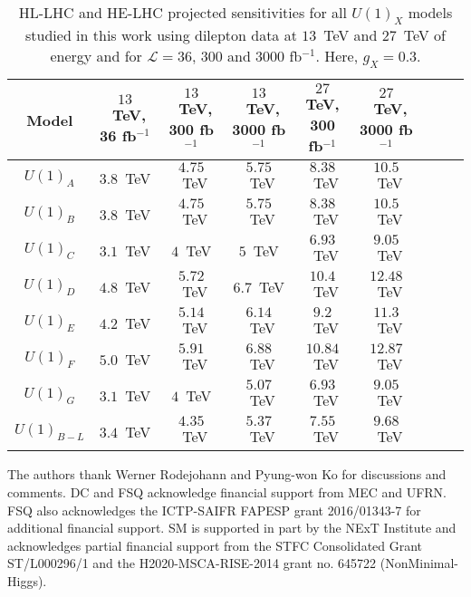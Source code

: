 \begin{table*}[!t]
\centering
\small\begin{tabular}{ccccccccc}
\hline 
Model & $13$~TeV, 36 fb$^{-1}$ & $13$~TeV, 300 fb$^{-1}$ &  $13$~TeV, 3000 fb$^{-1}$ & $27$ TeV, 300 fb$^{-1}$  & $27$~TeV, 3000 fb$^{-1}$\\ \hline 
$U(1)_A$ & $3.8$~TeV & $4.75$~TeV & $5.75$~TeV & $8.38$~TeV & $10.5$~TeV \\
$U(1)_B$ & $3.8$~TeV & $4.75$~TeV & $5.75$~TeV & $8.38$~TeV & $10.5$~TeV \\
$U(1)_C$ & $3.1$~TeV & $4$~TeV & $5$~TeV & $6.93$~TeV & $9.05$~TeV \\
$U(1)_D$ & $4.8$~TeV & $5.72$~TeV & $6.7$~TeV & $10.4$~TeV & $12.48$~TeV \\
$U(1)_E$ & $4.2$~TeV & $5.14$~TeV & $6.14$~TeV & $9.2$~TeV & $11.3$~TeV \\
$U(1)_F$ & $5.0$~TeV & $5.91$~TeV & $6.88$~TeV & $10.84$~TeV & $12.87$~TeV \\
$U(1)_G$ & $3.1$~TeV & $4$~TeV & $5.07$~TeV & $6.93$~TeV & $9.05$~TeV \\
$U(1)_{B-L}$ & $3.4$~TeV & $4.35$~TeV & $5.37$~TeV & $7.55$~TeV  & $9.68$~TeV \\
\hline
\end{tabular}\normalsize
\caption{HL-LHC and HE-LHC projected sensitivities for all $U(1)_X$ models studied in this work
using dilepton data at $13$~TeV and $27$~TeV of \com energy and for $\mathcal{L}=36$, 300 and 3000 fb$^{-1}$. Here, $g_X =0.3$.}
\label{tab:LHCforcast3}
\end{table*}

%
%

\noindent
The authors thank Werner Rodejohann and Pyung-won Ko
for  discussions  and  comments.   DC  and  FSQ  acknowledge
financial support from MEC and UFRN. FSQ also acknowledges the ICTP-SAIFR FAPESP grant 2016/01343-7 for additional  financial  support.   SM  is  supported  in  part  by  the
NExT  Institute  and  acknowledges  partial  financial  support
from  the  STFC  Consolidated  Grant  ST/L000296/1  and  the
H2020-MSCA-RISE-2014 grant no.   645722 (NonMinimal-
Higgs).

